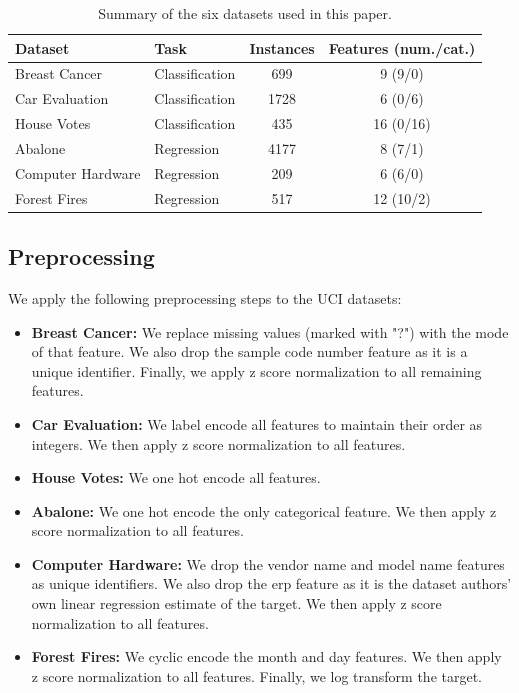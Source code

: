 \documentclass[twoside,11pt]{article}
\begin{document}
\begin{table}[h]
    \centering
    \begin{tabular}{llcc}
    \hline
    Dataset & Task & Instances & Features (num./cat.) \\
    \hline
    Breast Cancer     & Classification & 699  & 9 (9/0) \\
    Car Evaluation    & Classification & 1728 & 6 (0/6) \\
    House Votes       & Classification & 435  & 16 (0/16) \\
    Abalone           & Regression     & 4177 & 8 (7/1) \\
    Computer Hardware & Regression     & 209  & 6 (6/0) \\
    Forest Fires      & Regression     & 517  & 12 (10/2) \\
    \hline
    \end{tabular}
    \caption{Summary of the six datasets used in this paper.}
    \label{tab:datasets}
\end{table}

\subsection{Preprocessing}
We apply the following preprocessing steps to the UCI datasets:
\begin{itemize}
    \item \textbf{Breast Cancer:} We replace missing values (marked with "?") with the mode of that feature. We also drop the sample code number feature as it is a unique identifier. Finally, we apply z score normalization to all remaining features.
    \item \textbf{Car Evaluation:} We label encode all features to maintain their order as integers. We then apply z score normalization to all features.
    \item \textbf{House Votes:} We one hot encode all features.
    \item \textbf{Abalone:} We one hot encode the only categorical feature. We then apply z score normalization to all features.
    \item \textbf{Computer Hardware:} We drop the vendor name and model name features as unique identifiers. We also drop the erp feature as it is the dataset authors' own linear regression estimate of the target. We then apply z score normalization to all features.
    \item \textbf{Forest Fires:} We cyclic encode the month and day features. We then apply z score normalization to all features. Finally, we log transform the target.
\end{itemize}
\end{document}
